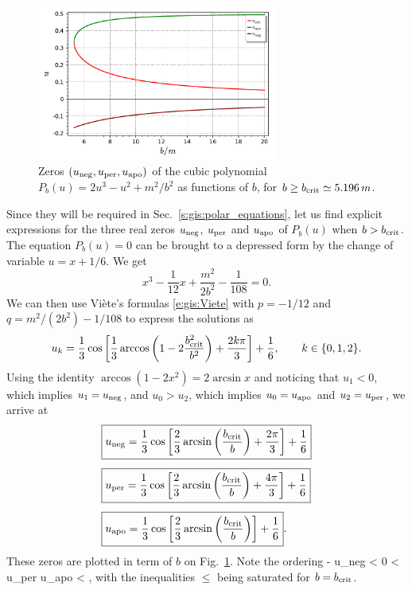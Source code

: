 \begin{figure}
\centerline{\includegraphics[width=0.7\textwidth]{gis_u_per_apo_neg.pdf}}
\caption[]{\label{f:gis:u_per_apo_neg} \footnotesize
Zeros $(u_{\rm neg}, u_{\rm per}, u_{\rm apo})$ of the cubic polynomial
$P_b(u) =  2 u^3 - u^2 + {m^2}/{b^2}$ as functions of $b$, for
$b\geq b_{\rm crit} \simeq 5.196\, m$.}
\end{figure}

Since they will be required in Sec.~\ref{s:gis:polar_equations}, let us
find explicit expressions for the three real zeros $u_{\rm neg}$,
$u_{\rm per}$ and $u_{\rm apo}$ of $P_b(u)$ when $b > b_{\rm crit}$. The
equation $P_b(u) = 0$ can be brought to a depressed form by the change
of variable $u = x + 1/6$. We get
\[
    x^3 - \frac{1}{12} x + \frac{m^2}{2b^2} - \frac{1}{108} = 0 .
\]
We can then use Viète's formulas \eqref{e:gis:Viete}
with $p = -1/12$ and $q = m^2/(2b^2) - 1/108$ to express the solutions
as
\[
    u_k = \frac{1}{3} \cos \left[ \frac{1}{3}
        \arccos \left( 1 - 2 \frac{b_{\rm crit}^2}{b^2} \right) + \frac{2 k \pi}{3} \right]
        + \frac{1}{6},
        \qquad k \in \{0, 1, 2\} .
\]
Using the identity $\arccos(1 - 2 x^2) = 2\arcsin x$ and noticing
that $u_1 < 0$, which implies $u_1 = u_{\rm neg}$, and $u_ 0 > u_2$, which
implies $u_0 = u_{\rm apo}$ and $u_2 = u_{\rm per}$,
we arrive at
\begin{subequations}
\label{e:gis:zeros_Pbu}
\begin{align}
  &  \fbox{$\displaystyle u_{\rm neg} = \frac{1}{3}\cos\left[ \frac{2}{3} \arcsin\left(
   \frac{b_{\rm crit}}{b}\right) + \frac{2\pi}{3}\right] + \frac{1}{6} $}\\[1ex]
 & \fbox{$\displaystyle  u_{\rm per} = \frac{1}{3}\cos\left[ \frac{2}{3} \arcsin\left(
   \frac{b_{\rm crit}}{b}\right) + \frac{4\pi}{3}\right] + \frac{1}{6} $}
                            \label{e:gis:u_per_b}\\[1ex]
 & \fbox{$\displaystyle  u_{\rm apo} = \frac{1}{3}\cos\left[ \frac{2}{3} \arcsin\left(
   \frac{b_{\rm crit}}{b}\right) \right] + \frac{1}{6} $} .
\end{align}
\end{subequations}
These zeros are plotted in term of $b$ on Fig.~\ref{f:gis:u_per_apo_neg}.
Note the ordering
\be \label{e:gis:order_u_zeros}
    - \leq u_{\rm neg} < 0 < u_{\rm per} \leq {}
    \leq u_{\rm apo} <  ,
\ee
with the inequalities $\leq$ being saturated for $b = b_{\rm crit}$.

